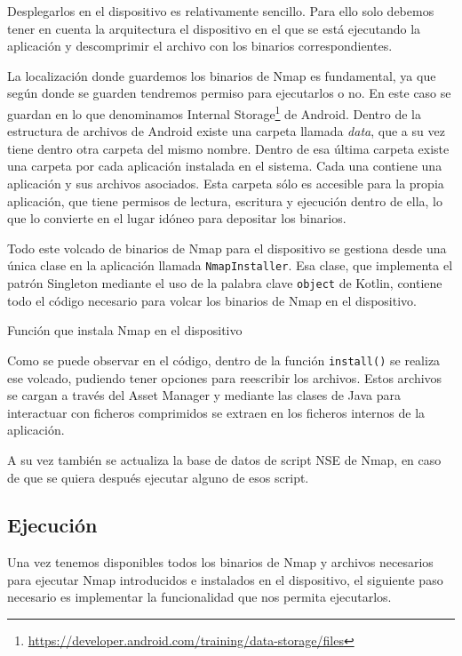 Desplegarlos en el dispositivo es relativamente sencillo. Para ello solo debemos tener en cuenta la arquitectura el dispositivo en el que se está ejecutando la aplicación y descomprimir el archivo con los binarios correspondientes.

La localización donde guardemos los binarios de Nmap es fundamental, ya que según donde se guarden tendremos permiso para ejecutarlos o no. En este caso se guardan en lo que denominamos Internal Storage\footnote{\url{https://developer.android.com/training/data-storage/files}} de Android. Dentro de la estructura de archivos de Android existe una carpeta llamada \textit{data}, que a su vez tiene dentro otra carpeta del mismo nombre. Dentro de esa última carpeta existe una carpeta por cada aplicación instalada en el sistema. Cada una contiene una aplicación y sus archivos asociados. Esta carpeta sólo es accesible para la propia aplicación, que tiene permisos de lectura, escritura y ejecución dentro de ella, lo que lo convierte en el lugar idóneo para depositar los binarios.

Todo este volcado de binarios de Nmap para el dispositivo se gestiona desde una única clase en la aplicación llamada \texttt{NmapInstaller}. Esa clase, que implementa el patrón Singleton mediante el uso de la palabra clave \texttt{object} de Kotlin, contiene todo el código necesario para volcar los binarios de Nmap en el dispositivo.

\begin{code}
	\caption{Función que instala Nmap en el dispositivo}
	\label{code:install}
		
\end{code}

Como se puede observar en el código, dentro de la función \texttt{install()} se realiza ese volcado, pudiendo tener opciones para reescribir los archivos. Estos archivos se cargan a través del Asset Manager y mediante las clases de Java para interactuar con ficheros comprimidos se extraen en los ficheros internos de la aplicación.

A su vez también se actualiza la base de datos de script NSE de Nmap, en caso de que se quiera después ejecutar alguno de esos script. 

\subsection{Ejecución}

Una vez tenemos disponibles todos los binarios de Nmap y archivos necesarios para ejecutar Nmap introducidos e instalados en el dispositivo, el siguiente paso necesario es implementar la funcionalidad que nos permita ejecutarlos.

